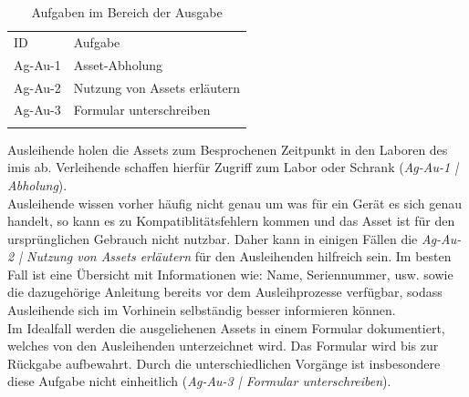\begin{table}[h]
        \centering
        \caption{Aufgaben im Bereich der Ausgabe}
        \begin{tabular}{ll}
                \arrayrulecolor{maincolor}\hline
                \sffamily\color{maincolor}ID & \sffamily\color{maincolor}Aufgabe \\
                \arrayrulecolor{maincolor}\hline
                Ag-Au-1                      & Asset-Abholung                    \\
                Ag-Au-2                      & Nutzung von Assets erläutern      \\
                Ag-Au-3                      & Formular unterschreiben           \\
                \arrayrulecolor{maincolor}\hline
        \end{tabular}
        \label{table:Ag-Au}
\end{table}

Ausleihende holen die Assets zum Besprochenen Zeitpunkt in den Laboren des \ac{imis} ab. Verleihende
schaffen hierfür Zugriff zum Labor oder Schrank (\textit{Ag-Au-1 | Abholung}). \\
Ausleihende wissen vorher häufig nicht genau um was für ein Gerät es sich genau handelt, so kann es
zu Kompatiblitätsfehlern kommen und das Asset ist für den ursprünglichen Gebrauch nicht nutzbar.
Daher kann in einigen Fällen die \textit{Ag-Au-2 | Nutzung von Assets erläutern} für den
Ausleihenden hilfreich sein. Im besten Fall ist eine Übersicht mit Informationen wie: Name,
Seriennummer, usw. sowie die dazugehörige Anleitung bereits vor dem Ausleihprozesse verfügbar,
sodass Ausleihende sich im Vorhinein selbständig besser informieren können.\\
Im Idealfall werden die ausgeliehenen Assets in einem Formular dokumentiert, welches von den
Ausleihenden unterzeichnet wird. Das Formular wird bis zur Rückgabe aufbewahrt. Durch die
unterschiedlichen Vorgänge ist insbesondere diese Aufgabe nicht einheitlich (\textit{Ag-Au-3 |
        Formular unterschreiben}).

